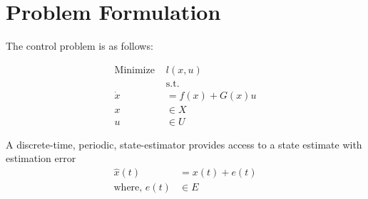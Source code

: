 \section{Problem Formulation} \label{sec:formulation}

The control problem is as follows:

\begin{subequations}
\label{eq:nonlinear dyanmics}
\begin{align}
\text{Minimize } &l(x,u) \\
&\text{s.t.} \nonumber \\
\dot{x}&=f(x)+G(x)u \\
x&\in X\\
u&\in U
\end{align}
\end{subequations}

A discrete-time, periodic, state-estimator provides access to a state estimate with estimation error
\begin{subequations}
\begin{align}
\hat{x}(t)&=x(t)+e(t) \\ 
\text{where, } e(t) &\in E
\end{align}
\end{subequations}

